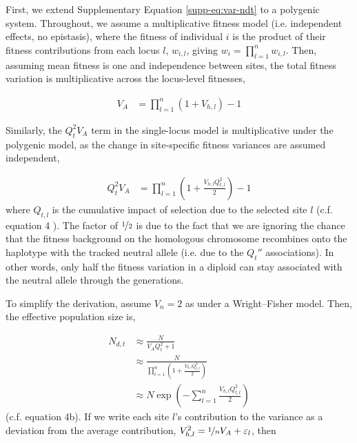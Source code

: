 \documentclass[11pt]{article}
\newcommand{\E}{\mathbb{E}}
\newcommand{\V}{\text{V}}
\begin{document}
First, we extend Supplementary Equation \eqref{supp-eq:var-ndt} to a polygenic
system. Throughout, we assume a multiplicative fitness model (i.e. independent
effects, no epistasis), where the fitness of individual $i$ is the product of
their fitness contributions from each locus $l$, $w_{i,l}$, giving $w_i =
\prod_{l=1}^n w_{i,l}$. Then, assuming mean fitness is one and independence
between sites, the total fitness variation is multiplicative across the
locus-level fitnesses,

\begin{align}
  V_A %
      &= \prod_{l=1}^n (1 + V_{h,l})  - 1
\end{align}

Similarly, the $Q_t^2 V_A$ term in the single-locus model is multiplicative
under the polygenic model, as the change in site-specific fitness variances are
assumed independent,

\begin{align}
  Q_t^2 V_A &= \prod_{l=1}^n \left(1 + \frac{V_{h,l} Q_{t,l}^2}{2}\right)  - 1
\end{align}
%
where $Q_{t,l}$ is the cumulative impact of selection due to the selected site
$l$ (c.f. equation 4 \cite{Santiago1998-bs}). The factor of $\nicefrac{1}{2}$
is due to the fact that we are ignoring the chance that the fitness background
on the homologous chromosome recombines onto the haplotype with the tracked
neutral allele (i.e. due to the $Q_t''$ associations). In other words, only
half the fitness variation in a diploid can stay associated with the neutral
allele through the generations.

To simplify the derivation, assume $V_n = 2$ as under a Wright--Fisher model.
Then, the effective population size is,

\begin{align}
  N_{d,t} &\approx \frac{N}{V_A Q_t^2 + 1} \nonumber \\
          &\approx \frac{N}{\prod_{l=1}^n \left(1 + \frac{V_{h,l} Q_{t,l}^2}{2}\right)} \nonumber \\
          &\approx N \exp\left(- \sum_{l=1}^n \frac{V_{h,l} Q_{t,l}^2}{2}\right)
\end{align}
%
(c.f. \cite{Santiago1998-bs} equation 4b). If we write each site $l$'s
contribution to the variance as a deviation from the average contribution,
$V_{h,l}^2 = \nicefrac{1}{n} V_A + \varepsilon_l$, then 
\end{document}
